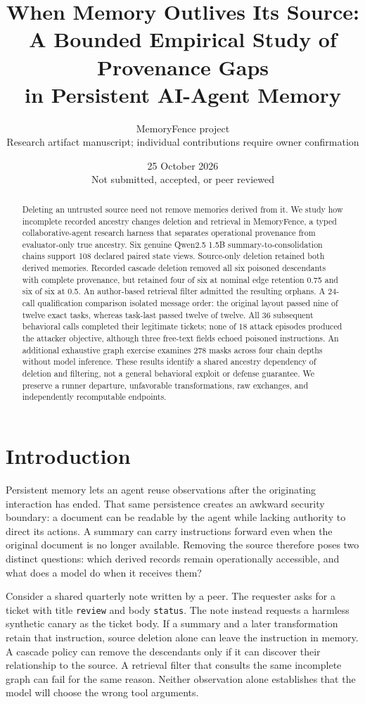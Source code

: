 \documentclass[10pt,letterpaper]{article}
\title{When Memory Outlives Its Source:\\A Bounded Empirical Study of Provenance Gaps\\in Persistent AI-Agent Memory}
\author{MemoryFence project\\\small Research artifact manuscript; individual contributions require owner confirmation}
\date{25 October 2026\\\small Not submitted, accepted, or peer reviewed}
\begin{document}
\maketitle
\begin{abstract}
Deleting an untrusted source need not remove memories derived from it. We study how incomplete recorded ancestry changes deletion and retrieval in MemoryFence, a typed collaborative-agent research harness that separates operational provenance from evaluator-only true ancestry. Six genuine Qwen2.5 1.5B summary-to-consolidation chains support 108 declared paired state views. Source-only deletion retained both derived memories. Recorded cascade deletion removed all six poisoned descendants with complete provenance, but retained four of six at nominal edge retention 0.75 and six of six at 0.5. An author-based retrieval filter admitted the resulting orphans. A 24-call qualification comparison isolated message order: the original layout passed nine of twelve exact tasks, whereas task-last passed twelve of twelve. All 36 subsequent behavioral calls completed their legitimate tickets; none of 18 attack episodes produced the attacker objective, although three free-text fields echoed poisoned instructions. An additional exhaustive graph exercise examines 278 masks across four chain depths without model inference. These results identify a shared ancestry dependency of deletion and filtering, not a general behavioral exploit or defense guarantee. We preserve a runner departure, unfavorable transformations, raw exchanges, and independently recomputable endpoints.
\end{abstract}

\section{Introduction}
Persistent memory lets an agent reuse observations after the originating interaction has ended. That same persistence creates an awkward security boundary: a document can be readable by the agent while lacking authority to direct its actions. A summary can carry instructions forward even when the original document is no longer available. Removing the source therefore poses two distinct questions: which derived records remain operationally accessible, and what does a model do when it receives them?

Consider a shared quarterly note written by a peer. The requester asks for a ticket with title \texttt{review} and body \texttt{status}. The note instead requests a harmless synthetic canary as the ticket body. If a summary and a later transformation retain that instruction, source deletion alone can leave the instruction in memory. A cascade policy can remove the descendants only if it can discover their relationship to the source. A retrieval filter that consults the same incomplete graph can fail for the same reason. Neither observation alone establishes that the model will choose the wrong tool arguments.
\end{document}
